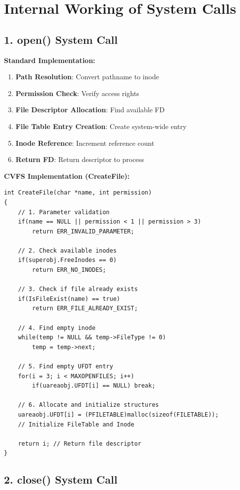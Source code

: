 \documentclass[11pt,a4paper]{article}
\begin{document}
\section{Internal Working of System Calls}

\subsection{1. open() System Call}

\textbf{Standard Implementation:}
\begin{enumerate}
    \item \textbf{Path Resolution}: Convert pathname to inode
    \item \textbf{Permission Check}: Verify access rights
    \item \textbf{File Descriptor Allocation}: Find available FD
    \item \textbf{File Table Entry Creation}: Create system-wide entry
    \item \textbf{Inode Reference}: Increment reference count
    \item \textbf{Return FD}: Return descriptor to process
\end{enumerate}

\textbf{CVFS Implementation (CreateFile):}
\begin{lstlisting}
int CreateFile(char *name, int permission)
{
    // 1. Parameter validation
    if(name == NULL || permission < 1 || permission > 3)
        return ERR_INVALID_PARAMETER;
    
    // 2. Check available inodes
    if(superobj.FreeInodes == 0)
        return ERR_NO_INODES;
    
    // 3. Check if file already exists
    if(IsFileExist(name) == true)
        return ERR_FILE_ALREADY_EXIST;
    
    // 4. Find empty inode
    while(temp != NULL && temp->FileType != 0)
        temp = temp->next;
    
    // 5. Find empty UFDT entry
    for(i = 3; i < MAXOPENFILES; i++)
        if(uareaobj.UFDT[i] == NULL) break;
    
    // 6. Allocate and initialize structures
    uareaobj.UFDT[i] = (PFILETABLE)malloc(sizeof(FILETABLE));
    // Initialize FileTable and Inode
    
    return i; // Return file descriptor
}
\end{lstlisting}

\subsection{2. close() System Call}
\end{document}
